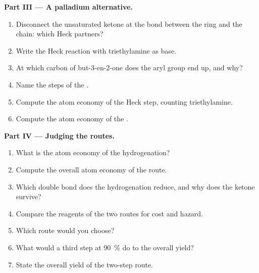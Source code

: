 \begin{problem}
\medskip
\noindent\textbf{Part III --- A palladium alternative.}
\begin{enumerate}[resume]
  \item Disconnect the unsaturated ketone at the bond between the ring and the chain: which Heck
        partners?
  \item Write the Heck reaction with triethylamine as base.
  \item At which carbon of but-3-en-2-one does the aryl group end up, and why?
  \item Name the steps of the .
  \item Compute the atom economy of the Heck step, counting triethylamine.
  \item Compute the atom economy of the .
\end{enumerate}

\medskip
\noindent\textbf{Part IV --- Judging the routes.}
\begin{enumerate}[resume]
  \item What is the atom economy of the hydrogenation?
  \item Compute the overall atom economy of the  route.
  \item Which double bond does the hydrogenation reduce, and why does the ketone survive?
  \item Compare the reagents of the two routes for cost and hazard.
  \item Which route would you choose?
  \item What would a third step at 90~\% do to the overall yield?
  \item State the overall yield of the two-step  route.
\end{enumerate}
\end{problem}
